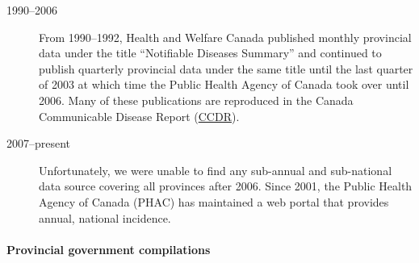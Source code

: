 \documentclass[12pt]{article}
\begin{document}
\begin{description}
\item[1990--2006] From 1990--1992, Health and Welfare Canada published monthly provincial data under the title ``Notifiable Diseases Summary'' and continued to publish quarterly provincial data under the same title until the last quarter of 2003 at which time the Public Health Agency of Canada took over until 2006. Many of these publications are reproduced in the Canada Communicable Disease Report (\href{https://www.canada.ca/en/public-health/services/reports-publications/canada-communicable-disease-report-ccdr.html}{CCDR}).
\item[2007--present] Unfortunately, we were unable to find any sub-annual and sub-national data source covering all provinces after 2006. Since 2001, the Public Health Agency of Canada (PHAC) has maintained a web portal \cite{totten2019updates} that provides annual, national incidence.
\end{description}

\paragraph*{Provincial government compilations}
\end{document}

